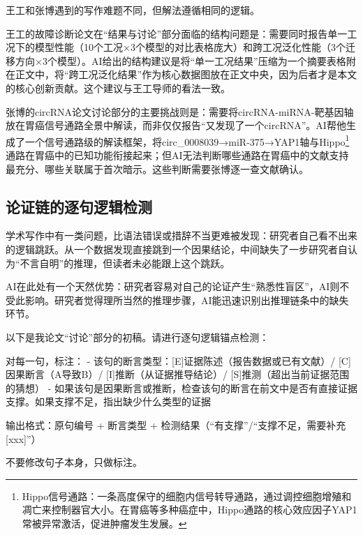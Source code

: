 \medskip
王工和张博遇到的写作难题不同，但解法遵循相同的逻辑。

王工的故障诊断论文在``结果与讨论''部分面临的结构问题是：需要同时报告单一工况下的模型性能（10个工况×3个模型的对比表格庞大）和跨工况泛化性能（3个迁移方向×3个模型）。AI给出的结构建议是将``单一工况结果''压缩为一个摘要表格附在正文中，将``跨工况泛化结果''作为核心数据图放在正文中央，因为后者才是本文的核心创新贡献。这个建议与王工导师的看法一致。

张博的circRNA论文讨论部分的主要挑战则是：需要将circRNA-miRNA-靶基因轴放在胃癌信号通路全景中解读，而非仅仅报告``又发现了一个circRNA''。AI帮他生成了一个信号通路级的解读框架，将circ\_0008039→miR-375→YAP1轴与Hippo\footnote{Hippo信号通路：一条高度保守的细胞内信号转导通路，通过调控细胞增殖和凋亡来控制器官大小。在胃癌等多种癌症中，Hippo通路的核心效应因子YAP1常被异常激活，促进肿瘤发生发展。}通路在胃癌中的已知功能衔接起来；但AI无法判断哪些通路在胃癌中的文献支持最充分、哪些关联属于首次暗示。这些判断需要张博逐一查文献确认。


\subsection{论证链的逐句逻辑检测}

学术写作中有一类问题，比语法错误或措辞不当更难被发现：研究者自己看不出来的逻辑跳跃。从一个数据发现直接跳到一个因果结论，中间缺失了一步研究者自认为``不言自明''的推理，但读者未必能跟上这个跳跃。

AI在此处有一个天然优势：研究者容易对自己的论证产生``熟悉性盲区''，AI则不受此影响。研究者觉得理所当然的推理步骤，AI能迅速识别出推理链条中的缺失环节。

\begin{userbox}
以下是我论文``讨论''部分的初稿。请进行逐句逻辑锚点检测：

对每一句，标注：
- 该句的断言类型：[E]证据陈述（报告数据或已有文献）/ [C]因果断言（A导致B）/ [I]推断（从证据推导结论）/ [S]推测（超出当前证据范围的猜想）
- 如果该句是因果断言或推断，检查该句的断言在前文中是否有直接证据支撑。如果支撑不足，指出缺少什么类型的证据

输出格式：原句编号 + 断言类型 + 检测结果（``有支撑''/``支撑不足，需要补充[xxx]''）

不要修改句子本身，只做标注。
\end{userbox}

